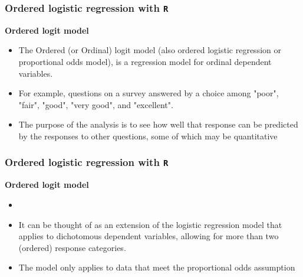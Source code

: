 \documentclass[00-GLMregslides.tex]{subfiles}
\begin{document}
\begin{frame}
\frametitle{Ordered logistic regression with \texttt{R} }
\textbf{Ordered logit model}

\begin{itemize}
\item The Ordered (or Ordinal) logit model (also ordered logistic regression or proportional odds model), is a regression model for ordinal dependent variables. 
\item For example, questions on a survey answered by a choice among "poor", "fair", "good", "very good", and "excellent".
\item The purpose of 
the analysis is to see how well that response can be predicted by the responses to other questions, some of which may be quantitative
\end{itemize}

\end{frame}

\begin{frame}
\frametitle{Ordered logistic regression with \texttt{R} }
\textbf{Ordered logit model}

\begin{itemize}
\item 
\item It can be thought of as an extension of the 
logistic regression model that applies to dichotomous dependent variables, allowing for more than two (ordered) response categories.
\item The model only applies to data that meet the proportional odds assumption
\end{itemize}
\end{frame}




\end{document}
